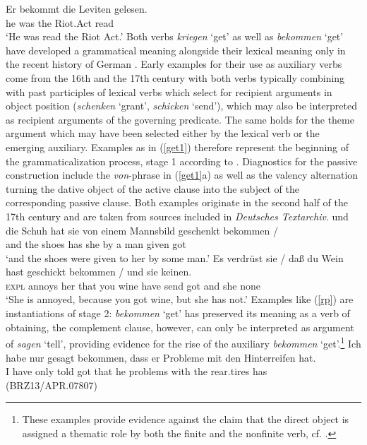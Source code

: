 \documentclass[output=paper
	        ,collection
	        ,collectionchapter
 	        ,biblatex
                ,babelshorthands
                ,newtxmath
                ,draftmode
                ,colorlinks, citecolor=brown
]{./langsci/langscibook}
\begin{document}
\ea \label{bek} 
\gll  Er bekommt die Leviten gelesen.  \\  he was the Riot.Act read \\
\glt `He was read the Riot Act.'
\z
Both verbs \textit{kriegen} `get' as well as \textit{bekommen} `get' have developed a grammatical meaning alongside their lexical meaning only in the recent history of German \citep{glaser2005, lenz2012}. Early examples for their use as auxiliary verbs come from the 16th and the 17th century with both verbs typically combining with past participles of lexical verbs which select for recipient arguments in object position (\textit{schenken} `grant', \textit{schicken} `send'), which may also be interpreted as recipient arguments of the governing predicate. The same holds for the theme argument which may have been selected either by the lexical verb or the emerging auxiliary. Examples as in (\ref{get1}) therefore represent the beginning of the grammaticalization process, \ie stage 1 according to \cite[63]{ebert78}. Diagnostics for the passive construction include the \textit{von}-phrase in (\ref{get1}a) as well as the valency alternation turning the dative object of the active clause into the subject of the corresponding passive clause. Both examples originate in the second half of the 17th century and are taken from sources included in \textit{Deutsches Textarchiv}. 
\eal \label{get1}
\ex
\gll und die Schuh hat sie von einem Mannsbild geschenkt bekommen / \\  and the shoes has she by a man given got  \\ 
\glt `and the shoes were given to her by some man.' 
\ex
\gll  Es verdrüst sie / daß du Wein hast geschickt bekommen / und sie keinen.  \\  \textsc{expl} annoys her {} that you wine have send got {} and she none  \\ 
\glt `She is annoyed, because you got wine, but she has not.'
\zl
Examples like (\ref{rp}) are instantiations of stage 2: \textit{bekommen} `get' has preserved its meaning as a verb of obtaining, the complement clause, however, can only be interpreted as argument of \textit{sagen} `tell', providing evidence for the rise of the auxiliary \textit{bekommen} `get'.\footnote{These examples provide evidence against the claim that the direct object is assigned a thematic role by both the finite and the nonfinite verb, cf. \cite{haider1986}.} 
\ea \label{rp} 
\gll  Ich habe nur gesagt bekommen, dass er Probleme mit den Hinterreifen hat.  \\  I have only told got that he problems with the rear.tires has \\ \hfill  (BRZ13/APR.07807)
\end{document}
